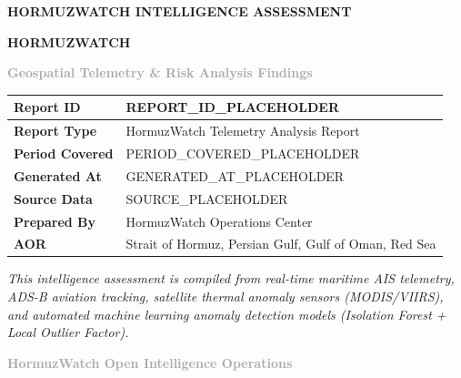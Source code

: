 \documentclass[11pt,a4paper]{article}
\newcommand{\metadatarow}[2]{
    \textbf{#1} & #2 \\ \hline
}
\begin{document}
\thispagestyle{fancy}
\begin{center}
    \vspace*{2cm}
    
    {\textcolor{primaryblue}{\Large\textbf{HORMUZWATCH INTELLIGENCE ASSESSMENT}}}
    
    \vspace{2.0cm}
    
    {\Huge\bfseries\textcolor{primaryblue}{HORMUZWATCH}}
    
    \vspace{0.5cm}
    {\Large\bfseries\textcolor{darkgray}{Geospatial Telemetry \& Risk Analysis Findings}}
    
    \vspace{2.0cm}
    
    \begin{tabular}{|m{5cm}|m{8cm}|}
        \hline
        \metadatarow{Report ID}{REPORT_ID_PLACEHOLDER}
        \metadatarow{Report Type}{HormuzWatch Telemetry Analysis Report}
        \metadatarow{Period Covered}{PERIOD_COVERED_PLACEHOLDER}
        \metadatarow{Generated At}{GENERATED_AT_PLACEHOLDER}
        \metadatarow{Source Data}{SOURCE_PLACEHOLDER}
        \metadatarow{Prepared By}{HormuzWatch Operations Center}
        \metadatarow{AOR}{Strait of Hormuz, Persian Gulf, Gulf of Oman, Red Sea}
        \hline
    \end{tabular}
    
    \vspace{2cm}
    
    \begin{minipage}{12cm}
        \centering
        \small\itshape
        This intelligence assessment is compiled from real-time maritime AIS telemetry, ADS-B aviation tracking, satellite thermal anomaly sensors (MODIS/VIIRS), and automated machine learning anomaly detection models (Isolation Forest + Local Outlier Factor).
    \end{minipage}
    
    \vfill
    
    {\textcolor{darkgray}{\small\textbf{HormuzWatch Open Intelligence Operations}}}
    
    \vspace{1cm}
\end{center}

\newpage
\end{document}
